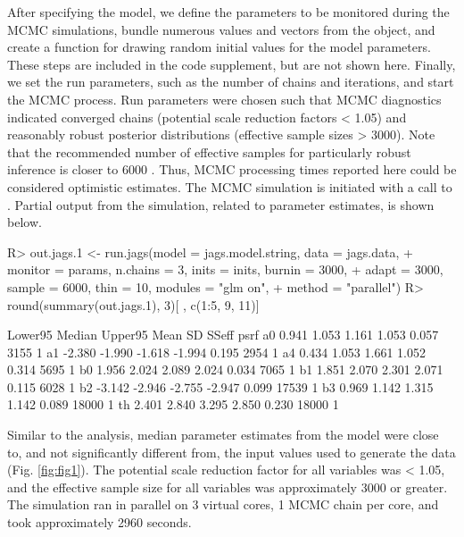 \documentclass[codesnippet]{jss}
\begin{document}
After specifying the  model, we define the parameters to be monitored during the MCMC simulations, bundle numerous values and vectors from the  object, and create a function for drawing random initial values for the model parameters. These steps are included in the code supplement, but are not shown here. Finally, we set the run parameters, such as the number of chains and iterations, and start the MCMC process. Run parameters were chosen such that MCMC diagnostics indicated converged chains (potential scale reduction factors < 1.05) and reasonably robust posterior distributions (effective sample sizes > 3000). Note that the recommended number of effective samples for particularly robust inference is closer to 6000 \citep{Gong_Flegal_2016}. Thus, MCMC processing times reported here could be considered optimistic estimates. The MCMC simulation is initiated with a call to . Partial output from the simulation, related to parameter estimates, is shown below.

\begin{CodeInput}
R> out.jags.1 <- run.jags(model = jags.model.string, data = jags.data, 
+    monitor = params, n.chains = 3, inits = inits, burnin = 3000, 
+    adapt = 3000, sample = 6000, thin = 10, modules = "glm on", 
+    method = "parallel")
R> round(summary(out.jags.1), 3)[ , c(1:5, 9, 11)]
\end{CodeInput}
\begin{CodeOutput}
            Lower95 Median Upper95   Mean    SD SSeff psrf
a0            0.941  1.053   1.161  1.053 0.057  3155    1
a1           -2.380 -1.990  -1.618 -1.994 0.195  2954    1
a4            0.434  1.053   1.661  1.052 0.314  5695    1
b0            1.956  2.024   2.089  2.024 0.034  7065    1
b1            1.851  2.070   2.301  2.071 0.115  6028    1
b2           -3.142 -2.946  -2.755 -2.947 0.099 17539    1
b3            0.969  1.142   1.315  1.142 0.089 18000    1
th            2.401  2.840   3.295  2.850 0.230 18000    1
\end{CodeOutput}

Similar to the  analysis, median parameter estimates from the  model were close to, and not significantly different from, the input values used to generate the data (Fig. \ref{fig:fig1}). The potential scale reduction factor for all variables was < 1.05, and the effective sample size for all variables was approximately 3000 or greater. The simulation ran in parallel on 3 virtual cores, 1 MCMC chain per core, and took approximately 2960 seconds.
\end{document}
